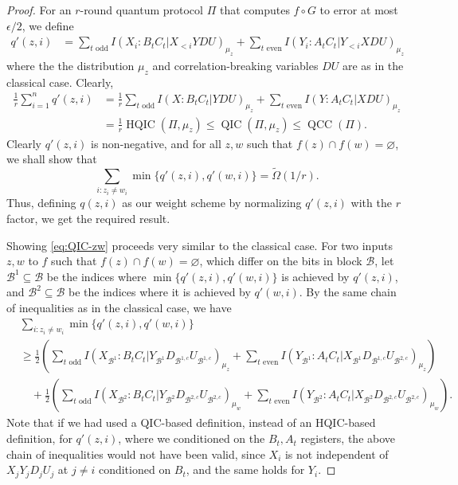\documentclass[10pt,a4paper]{article}
\theoremstyle{definition}
\renewcommand{\>}{\rangle}
\newcommand{\<}{\langle}
\newcommand{\cB}{\mathcal{B}}
\DeclareMathOperator{\QCC}{QCC}
\DeclareMathOperator{\QIC}{QIC}
\DeclareMathOperator{\HQIC}{HQIC}
\begin{document}
\begin{proof}
For an $r$-round quantum protocol $\Pi$ that computes $f\circ G$ to error at most $\epsilon/2$, we define
\begin{align*}
q'(z,i) & = \sum_{t\text{ odd}}I(X_i:B_tC_t|X_{<i}YDU)_{\mu_z} + \sum_{t\text{ even}}I(Y_i:A_tC_t|Y_{<i}XDU)_{\mu_z}
\end{align*}
where the the distribution $\mu_z$ and correlation-breaking variables $DU$ are as in the classical case. Clearly,
\begin{align*}
\frac{1}{r}\sum_{i=1}^n q'(z,i) & = \frac{1}{r} \sum_{t\text{ odd}}I(X:B_tC_t|YDU)_{\mu_z} + \sum_{t\text{ even}}I(Y:A_tC_t|XDU)_{\mu_z} \\
& = \frac{1}{r}\HQIC(\Pi,\mu_z) \leq \QIC(\Pi,\mu_z) \leq \QCC(\Pi).
\end{align*}
Clearly $q'(z,i)$ is non-negative, and for all $z,w$ such that $f(z)\cap f(w) = \varnothing$, we shall show that
\begin{equation}\label{eq:QIC-zw} \sum_{i:z_i\neq w_i}\min\{q'(z,i),q'(w,i)\} = \widetilde{\Omega}(1/r).\end{equation}
Thus, defining $q(z,i)$ as our weight scheme by normalizing $q'(z,i)$ with the $r$ factor, we get the required result.

Showing \eqref{eq:QIC-zw} proceeds very similar to the classical case. For two inputs $z, w$ to $f$ such that $f(z) \cap f(w) = \varnothing$, which differ on the bits in block $\cB$, let $\cB^1 \subseteq \cB$ be the indices where $\min\{q'(z,i), q'(w,i)\}$ is achieved by $q'(z,i)$, and $\cB^2 \subseteq \cB$ be the indices where it is achieved by $q'(w,i)$. By the same chain of inequalities as in the classical case, we have
\begin{align*}
& \sum_{i:z_i\neq w_i}\min\{q'(z,i), q'(w,i)\} \\
& \geq \frac{1}{2}\left(\sum_{t\text{ odd}}I(X_{\cB^1}:B_tC_t|Y_{\cB^1}D_{\cB^{1,c}}U_{\cB^{1,c}})_{\mu_z} + \sum_{t\text{ even}}I(Y_{\cB^1}:A_tC_t|X_{\cB^1}D_{\cB^{1,c}}U_{\cB^{2,c}})_{\mu_z}\right) \\
& \quad + \frac{1}{2}\left(\sum_{t\text{ odd}}I(X_{\cB^2}:B_tC_t|Y_{\cB^2}D_{\cB^{2,c}}U_{\cB^{2,c}})_{\mu_w} + \sum_{t\text{ even}}I(Y_{\cB^2}:A_tC_t|X_{\cB^2}D_{\cB^{2,c}}U_{\cB^{2,c}})_{\mu_w}\right).
\end{align*}
Note that if we had used a QIC-based definition, instead of an HQIC-based definition, for $q'(z,i)$, where we conditioned on the $B_t, A_t$ registers, the above chain of inequalities would not have been valid, since $X_i$ is not independent of $X_jY_jD_jU_j$ at $j\neq i$ conditioned on $B_t$, and the same holds for $Y_i$.


\end{proof}
\end{document}
